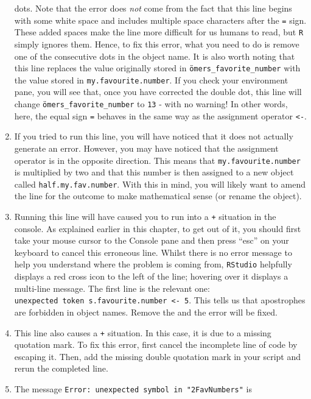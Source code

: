 \documentclass[
  letterpaper,
  DIV=11,
  numbers=noendperiod,
  oneside]{scrreprt}
\begin{document}
\begin{tcolorbox}
\begin{enumerate}
  dots. Note that the error does \emph{not} come from the fact that this
  line begins with some white space and includes multiple space
  characters after the \texttt{=} sign. These added spaces make the line
  more difficult for us humans to read, but \texttt{R} simply ignores
  them. Hence, to fix this error, what you need to do is remove one of
  the consecutive dots in the object name. It is also worth noting that
  this line replaces the value originally stored in
  \texttt{ömers\_favorite\_number} with the value stored in
  \texttt{my.favourite.number}. If you check your environment pane, you
  will see that, once you have corrected the double dot, this line will
  change \texttt{ömers\_favorite\_number} to \texttt{13} - with no
  warning! In other words, here, the equal sign \texttt{=} behaves in
  the same way as the assignment operator \texttt{\textless{}-}.
\item
  If you tried to run this line, you will have noticed that it does not
  actually generate an error. However, you may have noticed that the
  assignment operator is in the opposite direction. This means that
  \texttt{my.favourite.number} is multiplied by two and that this number
  is then assigned to a new object called \texttt{half.my.fav.number}.
  With this in mind, you will likely want to amend the line for the
  outcome to make mathematical sense (or rename the object).
\item
  Running this line will have caused you to run into a \texttt{+}
  situation in the console. As explained earlier in this chapter, to get
  out of it, you should first take your mouse cursor to the Console pane
  and then press ``esc'' on your keyboard to cancel this erroneous line.
  Whilst there is no error message to help you understand where the
  problem is coming from, \texttt{RStudio} helpfully displays a red
  cross icon to the left of the line; hovering over it displays a
  multi-line message. The first line is the relevant one:
  \texttt{unexpected\ token\ \textquotesingle{}s.favourite.number\ \textless{}-\ 5}.
  This tells us that apostrophes are forbidden in object names. Remove
  the \texttt{\textquotesingle{}} and the error will be fixed.
\item
  This line also causes a \texttt{+} situation. In this case, it is due
  to a missing quotation mark. To fix this error, first cancel the
  incomplete line of code by escaping it. Then, add the missing double
  quotation mark in your script and rerun the completed line.
\item
  The message \texttt{Error:\ unexpected\ symbol\ in\ "2FavNumbers"} is

\end{enumerate}
\end{tcolorbox}
\end{document}
